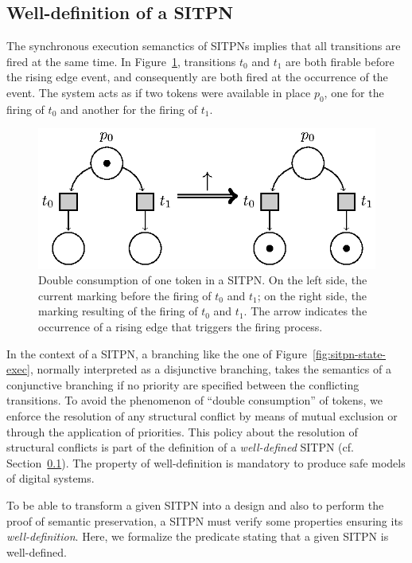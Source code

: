 \subsection{Well-definition of a SITPN}
\label{sec:sitpn-wd}

The synchronous execution semanctics of SITPNs implies that all
transitions are fired at the same time. In
Figure~\ref{fig:double-consum}, transitions $t_0$ and $t_1$ are both
firable before the rising edge event, and consequently are both fired
at the occurrence of the event. The system acts as if two tokens were
available in place $p_0$, one for the firing of $t_0$ and another for
the firing of $t_1$.

\begin{figure}[H]
  \centering
  \includegraphics[keepaspectratio=true, width=.6\textwidth]{double-consum.eps}
  \caption[Double consumption of token in a SITPN.]{Double consumption
    of one token in a SITPN. On the left side, the current marking
    before the firing of $t_0$ and $t_1$; on the right side, the
    marking resulting of the firing of $t_0$ and $t_1$. The arrow
    indicates the occurrence of a rising edge that triggers the firing
    process.}
  \label{fig:double-consum}
\end{figure}

In the context of a SITPN, a branching like the one of
Figure~\ref{fig:sitpn-state-exec}, normally interpreted as a
disjunctive branching, takes the semantics of a conjunctive branching
if no priority are specified between the conflicting transitions. To
avoid the phenomenon of ``double consumption'' of tokens, we enforce
the resolution of any structural conflict by means of mutual exclusion
or through the application of priorities. This policy about the
resolution of structural conflicts is part of the definition of a
\emph{well-defined} SITPN (cf. Section~\ref{sec:sitpn-wd}). The
property of well-definition is mandatory to produce safe models of
digital systems.

To be able to transform a given SITPN into a \vhdl{} design and also
to perform the proof of semantic preservation, a SITPN must verify
some properties ensuring its \emph{well-definition}. Here, we
formalize the predicate stating that a given SITPN is well-defined.

